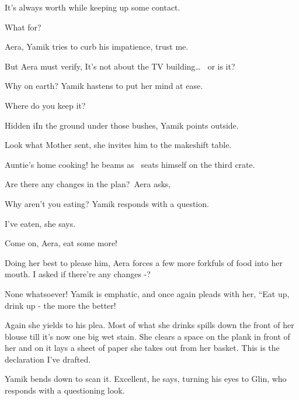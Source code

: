 \documentclass[12pt]{book}
\begin{document}
{\textquotedbl}It's always worth while keeping up some contact.{\textquotedbl}

{\textquotedbl}What for?{\textquotedbl}

{\textquotedbl}Aera,{\textquotedbl} Yamik tries to curb his impatience, {\textquotedbl}trust me.{\textquotedbl}

But Aera must verify, {\textquotedbl}It's not about the TV building{\dots} \ or is it?{\textquotedbl}

{\textquotedbl}Why on earth?{\textquotedbl} Yamik hastens to put her mind at ease. ~

{\textquotedbl}Where do you keep it?{\textquotedbl}

{\textquotedbl}Hidden iIn the ground under those bushes,{\textquotedbl} Yamik points outside.

{\textquotedbl}Look what Mother sent,{\textquotedbl} she invites him to the makeshift table.

{\textquotedbl}Auntie's home cooking!{\textquotedbl} he beams as \ seats himself on the third crate.

{\textquotedbl}Are there any changes in the plan?{\textquotedbl}~Aera asks,

{\textquotedbl}Why aren't you eating?{\textquotedbl} Yamik responds with a question.

{\textquotedbl}I've eaten,{\textquotedbl} she says. ~

{\textquotedbl}Come on, Aera, eat some more!{\textquotedbl} \

Doing her best to please him, Aera forces a few more forkfuls of food into her mouth. {\textquotedbl}I asked if there're
any changes -?{\textquotedbl}

{\textquotedbl}None whatsoever!{\textquotedbl} Yamik is emphatic, and once again pleads with her, ``Eat up, drink up
-{ }the more the better!{\textquotedbl}

Again she yields to his plea. Most of what she drinks spills down the front of her blouse till it's now one big wet
stain. She clears a space on the plank in front of her and on it lays a sheet of paper she takes out from her basket.
{\textquotedbl}This is the declaration I've drafted.{\textquotedbl}

Yamik bends down to scan it. {\textquotedbl}Excellent,{\textquotedbl} he says, turning his eyes to Glin, who responds
with a questioning look.
\end{document}
